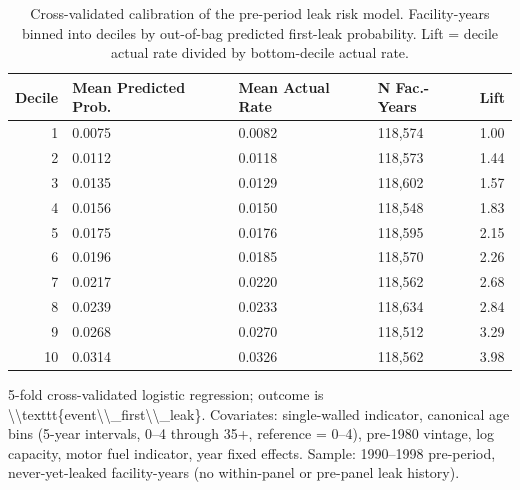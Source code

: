 \begin{table}[H]
\centering
\caption{\label{tab:tab:cv-calibration}Cross-validated calibration of the pre-period leak risk model. Facility-years binned into deciles by out-of-bag predicted first-leak probability. Lift = decile actual rate divided by bottom-decile actual rate.}
\centering
\fontsize{10}{12}\selectfont
\begin{threeparttable}
\begin{tabular}[t]{rllll}
\toprule
Decile & Mean Predicted Prob. & Mean Actual Rate & N Fac.-Years & Lift\\
\midrule
1 & 0.0075 & 0.0082 & 118,574 & 1.00\\
2 & 0.0112 & 0.0118 & 118,573 & 1.44\\
3 & 0.0135 & 0.0129 & 118,602 & 1.57\\
4 & 0.0156 & 0.0150 & 118,548 & 1.83\\
5 & 0.0175 & 0.0176 & 118,595 & 2.15\\
6 & 0.0196 & 0.0185 & 118,570 & 2.26\\
7 & 0.0217 & 0.0220 & 118,562 & 2.68\\
8 & 0.0239 & 0.0233 & 118,634 & 2.84\\
9 & 0.0268 & 0.0270 & 118,512 & 3.29\\
10 & 0.0314 & 0.0326 & 118,562 & 3.98\\
\bottomrule
\end{tabular}
\begin{tablenotes}
\item 5-fold cross-validated logistic regression; outcome is \textbackslash{}\textbackslash{}texttt\{event\textbackslash{}\textbackslash{}\_first\textbackslash{}\textbackslash{}\_leak\}. Covariates: single-walled indicator, canonical age bins (5-year intervals, 0--4 through 35+, reference = 0--4), pre-1980 vintage, log capacity, motor fuel indicator, year fixed effects. Sample: 1990--1998 pre-period, never-yet-leaked facility-years (no within-panel or pre-panel leak history).
\end{tablenotes}
\end{threeparttable}
\end{table}

